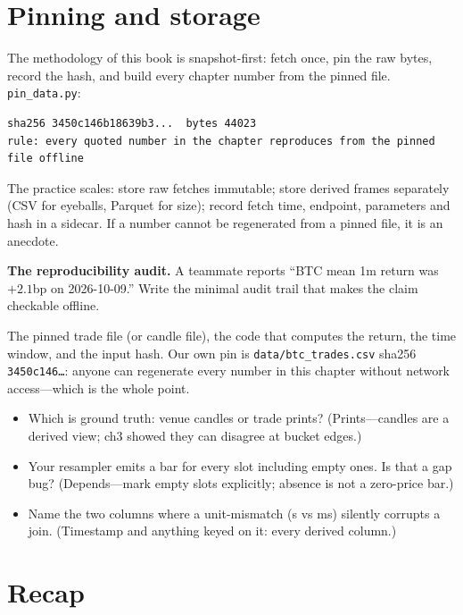 \section{Pinning and storage}\label{sec:pin}

The methodology of this book is snapshot-first: fetch once, pin the raw bytes, record the
hash, and build every chapter number from the pinned file. \texttt{pin\_data.py}:
\begin{lstlisting}[numbers=none]
sha256 3450c146b18639b3...  bytes 44023
rule: every quoted number in the chapter reproduces from the pinned file offline
\end{lstlisting}
The practice scales: store raw fetches immutable; store derived frames separately (CSV for
eyeballs, Parquet for size); record fetch time, endpoint, parameters and hash in a sidecar.
If a number cannot be regenerated from a pinned file, it is an anecdote.

\begin{example}\label{ex:pin}
\textbf{The reproducibility audit.} A teammate reports ``BTC mean 1m return was $+2.1$bp on
2026-10-09.'' Write the minimal audit trail that makes the claim checkable offline.
\begin{solution}
The pinned trade file (or candle file), the code that computes the return, the time window,
and the input hash. Our own pin is \texttt{data/btc\_trades.csv} sha256
\texttt{3450c146\ldots}: anyone can regenerate every number in this chapter without network
access---which is the whole point.
\end{solution}
\end{example}

\begin{checkpoint}
\begin{itemize}
\item Which is ground truth: venue candles or trade prints? (Prints---candles are a derived
view; ch3 showed they can disagree at bucket edges.)
\item Your resampler emits a bar for every slot including empty ones. Is that a gap bug?
(Depends---mark empty slots explicitly; absence is not a zero-price bar.)
\item Name the two columns where a unit-mismatch (s vs ms) silently corrupts a join.
(Timestamp and anything keyed on it: every derived column.)
\end{itemize}
\end{checkpoint}

\section{Recap}\label{sec:datarecap}


